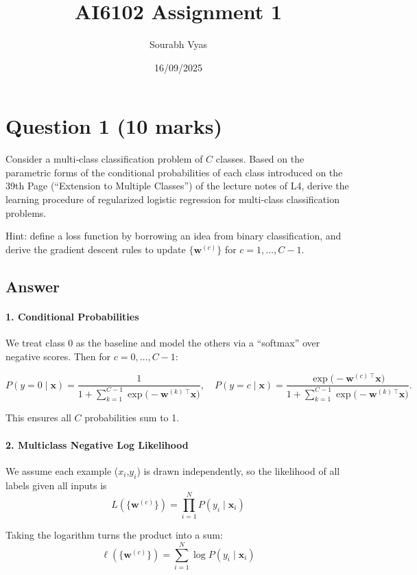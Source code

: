 \documentclass{article}
\title{AI6102 Assignment 1}
\author{Sourabh Vyas}
\date{16/09/2025}
\begin{document}
\maketitle

\section*{Question 1 (10 marks)}
Consider a multi‐class classification problem of \(C\) classes.  Based on the parametric forms of the conditional probabilities of each class introduced on the 39th Page (“Extension to Multiple Classes”) of the lecture notes of L4, derive the learning procedure of regularized logistic regression for multi‐class classification problems.  

Hint: define a loss function by borrowing an idea from binary classification, and derive the gradient descent rules to update \(\{\mathbf{w}^{(c)}\}\) for \(c=1,\dots,C-1\).

\bigskip
\subsection*{Answer}

\paragraph{1. Conditional Probabilities}
We treat class \(0\) as the baseline and model the others via a “softmax” over negative scores. Then for \(c=0,\dots,C-1\):


\[
P(y=0 \mid \mathbf{x})
=
\frac{1}
     {1 + \sum_{k=1}^{C-1}\exp\bigl(-\mathbf{w}^{(k)\,\top}\mathbf{x}\bigr)},
\quad
P(y=c \mid \mathbf{x})
=
\frac{\exp\bigl(-\mathbf{w}^{(c)\,\top}\mathbf{x}\bigr)}
     {1 + \sum_{k=1}^{C-1}\exp\bigl(-\mathbf{w}^{(k)\,\top}\mathbf{x}\bigr)}.
\]

This ensures all \(C\) probabilities sum to 1.


\paragraph{2. Multiclass Negative Log Likelihood}
We assume each example (\(x_i\),\(y_i\)) is drawn independently, so the likelihood of all labels given all inputs is
\[
L(\{\mathbf{w}^{(c)}\}) = \prod_{i=1}^N P(y_i \mid \mathbf{x}_i)
\]

Taking the logarithm turns the product into a sum:
\[
\ell(\{\mathbf{w}^{(c)}\}) = \sum_{i=1}^N \log P(y_i \mid \mathbf{x}_i)
\]
\end{document}
